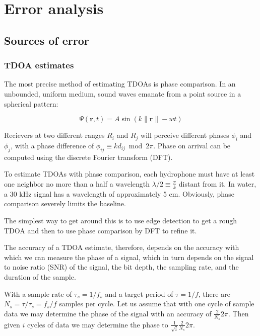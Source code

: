 \documentclass[10pt]{article}
\begin{document}
\section{Error analysis}

\subsection{Sources of error}

\subsubsection{TDOA estimates}\label{sec:tdoa-error}

The most precise method of estimating TDOAs is phase comparison.  In an unbounded, uniform medium, sound waves emanate from a point source in a spherical pattern:

\begin{equation}
\Psi(\mathbf{r},t)=A\sin(k\|\mathbf{r}\|-wt)
\end{equation}

Recievers at two different ranges \(R_i\) and \(R_j\) will perceive different phases \(\phi_i\) and \(\phi_j\), with a phase difference of \(\phi_{ij} \equiv kd_{ij}\bmod{2\pi}\).  Phase on arrival can be computed using the discrete Fourier transform (DFT).

To estimate TDOAs with phase comparison, each hydrophone must have at least one neighbor no more than a half a wavelength \(\lambda/2\equiv\frac{\pi}{k}\) distant from it.  In water, a 30 kHz signal has a wavelength of approximately 5 cm.  Obviously, phase comparison severely limits the baseline.

The simplest way to get around this is to use edge detection to get a rough TDOA and then to use phase comparison by DFT to refine it.

The accuracy of a TDOA estimate, therefore, depends on the accuracy with which we can measure the phase of a signal, which in turn depends on the signal to noise ratio (SNR) of the signal, the bit depth, the sampling rate, and the duration of the sample.

With a sample rate of \(\tau_s=1/f_s\) and a target period of \(\tau=1/f\), there are \(N_s=\tau/\tau_s=f_s/f\) samples per cycle.  Let us assume that with one cycle of sample data we may determine the phase of the signal with an accuracy of \(\frac{2}{N_s}2\pi\).  Then given \(i\) cycles of data we may determine the phase to \(\frac{1}{\sqrt i}\frac{2}{N_s}2\pi\).
\end{document}

